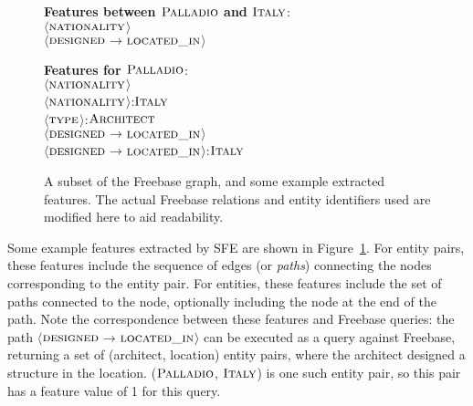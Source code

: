 \documentclass[11pt,letterpaper]{article}
\newcommand{\figref}[1]{Figure~\ref{fig:#1}}
\newcommand{\formalpredicate}[1]{{\small \ensuremath{\textsc{#1}}}}
\newcommand{\entity}[1]{\ensuremath{\textsc{#1}}}
\newcommand{\pathstart}{\ensuremath{\langle}}
\newcommand{\pathend}{\ensuremath{\rangle}}
\begin{document}
\begin{figure}
{\center
{}
}

\textbf{Features between \entity{Palladio} and \entity{Italy}}:\\
\pathstart\formalpredicate{nationality}\pathend\\
\pathstart\formalpredicate{designed}$\rightarrow$\formalpredicate{located\_in}\pathend

\textbf{Features for \entity{Palladio}}:\\
\pathstart\formalpredicate{nationality}\pathend\\
\pathstart\formalpredicate{nationality}\pathend:\entity{Italy}\\
\pathstart\formalpredicate{type}\pathend:\entity{Architect}\\
\pathstart\formalpredicate{designed}$\rightarrow$\formalpredicate{located\_in}\pathend \\
\pathstart\formalpredicate{designed}$\rightarrow$\formalpredicate{located\_in}\pathend:\entity{Italy}

\caption{A subset of the Freebase graph, and some example extracted features.  The actual
Freebase relations and entity identifiers used are modified here to aid readability.}
\label{fig:sfe}
\end{figure}

Some example features extracted by SFE are shown in \figref{sfe}.  For entity pairs, these features
include the sequence of edges (or \emph{paths}) connecting the nodes corresponding to the entity
pair.  For entities, these features include the set of paths connected to the node, optionally
including the node at the end of the path.  Note the correspondence between these features and
Freebase queries: the path
\pathstart\formalpredicate{designed}$\rightarrow$\formalpredicate{located\_in}\pathend{} can be
executed as a query against Freebase, returning a set of (architect, location) entity pairs, where
the architect designed a structure in the location. (\entity{Palladio}, \entity{Italy}) is one such
entity pair, so this pair has a feature value of 1 for this query.
\end{document}
